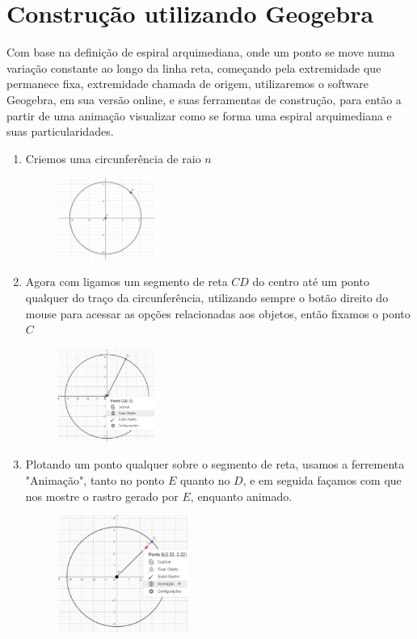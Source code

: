 \documentclass[twoside,a4paper,10pt]{article}
\begin{document}
\section{Construção utilizando Geogebra}
	Com base na definição de espiral arquimediana, onde um ponto se move numa variação constante ao longo da linha reta, começando pela extremidade que permanece fixa, extremidade chamada de origem, utilizaremos o software Geogebra, em sua versão online, e suas ferramentas de construção, para então a partir de uma animação visualizar como se forma uma espiral arquimediana e suas particularidades.
\clearpage
\begin{enumerate}
	\item Criemos uma circunferência de raio $n$
		\begin{figure}[!h]
			\includegraphics[width=0.3\textwidth]{c1}
		\end{figure}
	\item Agora com ligamos um segmento de reta $CD$ do centro até um ponto qualquer do traço da circunferência, utilizando sempre o botão direito do mouse para acessar as opções relacionadas aos objetos, então fixamos o ponto $C$
		\begin{figure}[!h]
			\includegraphics[width=0.3\textwidth]{c2}
		\end{figure}
	\item Plotando um ponto qualquer sobre o segmento de reta, usamos a ferrementa "Animação", tanto no ponto $E$ quanto no $D$, e em seguida façamos com que nos mostre o rastro gerado por $E$, enquanto animado.
		\begin{figure}[!h]
			{\includegraphics[width=0.4\textwidth]{c3}}

\end{figure}
\end{enumerate}
\end{document}
